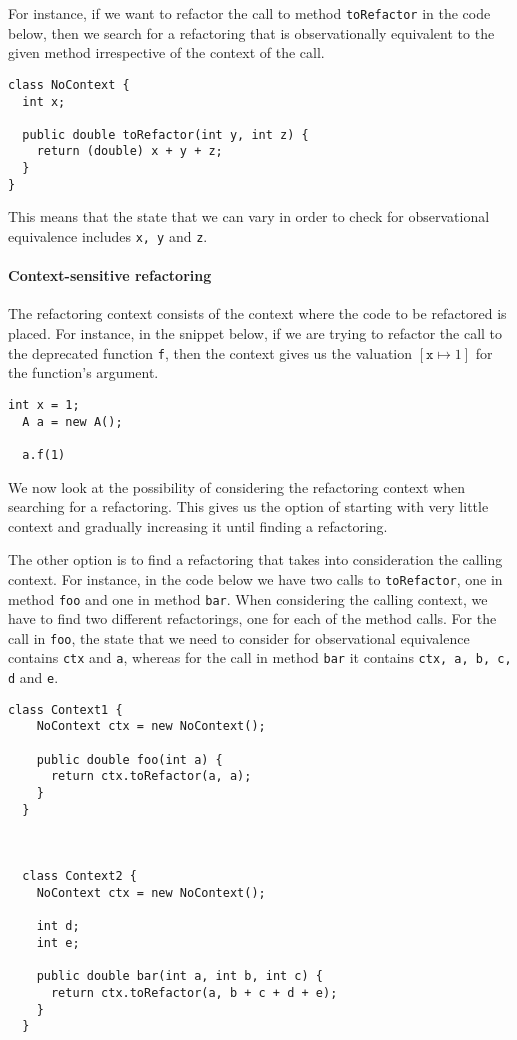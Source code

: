 \documentclass[runningheads,a4paper]{llncs}
\begin{document}
For instance, if we want to refactor the call to method
\texttt{toRefactor} in the code below, then we search for a refactoring that is
observationally equivalent to the given method irrespective of the
context of the call.

\begin{lstlisting}[mathescape=true]
class NoContext {
  int x;

  public double toRefactor(int y, int z) {
    return (double) x + y + z;
  }
}
\end{lstlisting}
 
This means that the state that we can vary in order to check for
observational equivalence includes \texttt{x, y} and \texttt{z}.

\paragraph{Context-sensitive refactoring}
The refactoring context consists of the context where the code to be refactored
is placed. For instance, in the snippet below, if we are trying to refactor the call to the deprecated
function \texttt{f}, then the context gives us the valuation $[\texttt{x}\mapsto 1]$ for the function's argument. 

\begin{lstlisting}[mathescape=true]
  int x = 1;
  A a = new A();
  
  a.f(1)
\end{lstlisting}
    
We now look at the possibility of considering the refactoring context
when searching for a refactoring. This gives us the option of starting
with very little context and gradually increasing it until finding a
refactoring. 

The other option is to find a refactoring that takes into consideration
the calling context. For instance, in the code below we have two
calls to \texttt{toRefactor}, one in method \texttt{foo} and one in
method \texttt{bar}. When considering the calling context, we have to
find two different refactorings, one for each of the method calls.
For the call in \texttt{foo}, the state that we need to consider for observational
equivalence contains \texttt{ctx} and \texttt{a}, whereas for the call in method
\texttt{bar} it contains \texttt{ctx, a, b, c, d} and \texttt{e}.

\begin{lstlisting}[mathescape=true]
  class Context1 {
    NoContext ctx = new NoContext();

    public double foo(int a) {
      return ctx.toRefactor(a, a);
    }
  }

 

  class Context2 {
    NoContext ctx = new NoContext();

    int d;
    int e;

    public double bar(int a, int b, int c) {
      return ctx.toRefactor(a, b + c + d + e);
    }
  }
\end{lstlisting}
\end{document}
